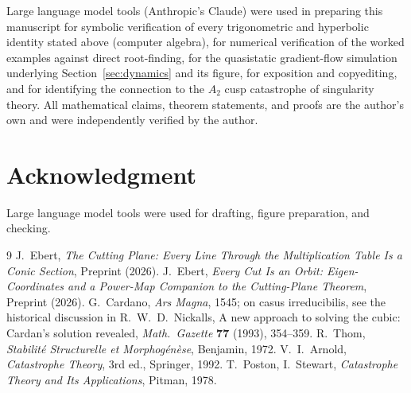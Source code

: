 \documentclass[11pt]{amsart}
\theoremstyle{remark}
\begin{document}
Large language model tools (Anthropic's Claude) were used in preparing this manuscript for symbolic verification of every trigonometric and hyperbolic identity stated above (computer algebra), for numerical verification of the worked examples against direct root-finding, for the quasistatic gradient-flow simulation underlying Section~\ref{sec:dynamics} and its figure, for exposition and copyediting, and for identifying the connection to the $A_2$ cusp catastrophe of singularity theory. All mathematical claims, theorem statements, and proofs are the author's own and were independently verified by the author.

\section*{Acknowledgment}
Large language model tools were used for drafting, figure preparation, and checking.

\begin{thebibliography}{9}
 J.~Ebert, \emph{The Cutting Plane: Every Line Through the Multiplication Table Is a Conic Section}, Preprint (2026).
 J.~Ebert, \emph{Every Cut Is an Orbit: Eigen-Coordinates and a Power-Map Companion to the Cutting-Plane Theorem}, Preprint (2026).
 G.~Cardano, \emph{Ars Magna}, 1545; on casus irreducibilis, see the historical discussion in R.~W.~D.~Nickalls, A new approach to solving the cubic: Cardan's solution revealed, \emph{Math.\ Gazette} \textbf{77} (1993), 354--359.
 R.~Thom, \emph{Stabilit\'e Structurelle et Morphog\'en\`ese}, Benjamin, 1972.
 V.~I.~Arnold, \emph{Catastrophe Theory}, 3rd ed., Springer, 1992.
 T.~Poston, I.~Stewart, \emph{Catastrophe Theory and Its Applications}, Pitman, 1978.
\end{thebibliography}
\end{document}
